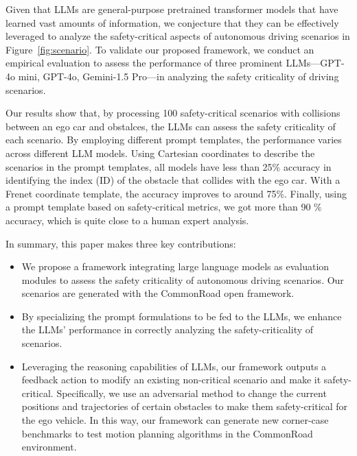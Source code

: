 Given that LLMs are general-purpose pretrained transformer models \cite{vaswani2017attention} that have learned vast amounts of information, we conjecture that they can be effectively leveraged to analyze the safety-critical aspects of autonomous driving scenarios in Figure~\ref{fig:scenario}. To validate our proposed framework, we conduct an empirical evaluation to assess the performance of three prominent LLMs—GPT-4o mini, GPT-4o\cite{achiam2023gpt}, Gemini-1.5 Pro\cite{team2023gemini}---in analyzing the safety criticality of driving scenarios. %

Our results show that,
by processing 100 safety-critical scenarios with collisions between an ego car and obstalces, the LLMs can assess the safety criticality of each scenario. By employing different prompt templates, the performance varies across different LLM models.
Using Cartesian coordinates to describe the scenarios in the prompt templates, all models have less than 25\% accuracy in identifying the index (ID) of the obstacle that collides with the ego car. With a Frenet coordinate template, the accuracy improves to around 75\%. Finally, using a prompt template based on safety-critical metrics, we got more than 90 \% accuracy, which is quite close to a human expert analysis.

In summary, this paper makes three key contributions:
\begin{itemize} 
    \item We propose a framework integrating large language models as evaluation modules to assess the safety criticality of autonomous driving scenarios. Our scenarios are generated with the CommonRoad open framework\cite{althoff2017commonroad}. 
    \item By specializing the prompt formulations to be fed to the LLMs, we enhance the LLMs' performance in correctly analyzing the safety-criticality of scenarios. 
    \item Leveraging the reasoning capabilities of LLMs, our framework outputs a feedback action to modify an existing non-critical scenario and make it safety-critical. Specifically, we use an adversarial method to change the current positions and trajectories of certain obstacles to make them safety-critical for the ego vehicle.
    In this way, our framework can generate new corner-case benchmarks to test motion planning algorithms in the CommonRoad environment. 
\end{itemize}

